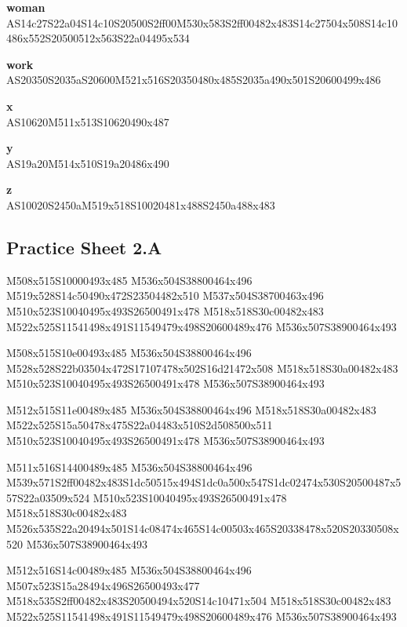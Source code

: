 \documentclass{article}
\begin{document}
\begin{glossary}
\textbf{woman}\\
AS14c27S22a04S14c10S20500S2ff00M530x583S2ff00482x483S14c27504x508S14c10486x552S20500512x563S22a04495x534

\textbf{work}\\
AS20350S2035aS20600M521x516S20350480x485S2035a490x501S20600499x486

\textbf{x}\\
AS10620M511x513S10620490x487

\textbf{y}\\
AS19a20M514x510S19a20486x490

\textbf{z}\\
AS10020S2450aM519x518S10020481x488S2450a488x483

\end{glossary}

\subsection{Practice Sheet 2.A}

\begin{multicols}{5}
\begin{center}

M508x515S10000493x485 %
M536x504S38800464x496 %
M519x528S14c50490x472S23504482x510 %
M537x504S38700463x496 %
M510x523S10040495x493S26500491x478 %
M518x518S30c00482x483 %
M522x525S11541498x491S11549479x498S20600489x476 %
M536x507S38900464x493 %
\vfil
\columnbreak

M508x515S10e00493x485 %
M536x504S38800464x496 %
M528x528S22b03504x472S17107478x502S16d21472x508 %
M518x518S30a00482x483 %
M510x523S10040495x493S26500491x478 %
M536x507S38900464x493 %
\vfil
\columnbreak

M512x515S11e00489x485 %
M536x504S38800464x496 %
M518x518S30a00482x483 %
M522x525S15a50478x475S22a04483x510S2d508500x511 %
M510x523S10040495x493S26500491x478 %
M536x507S38900464x493 %
\vfil
\columnbreak

M511x516S14400489x485 %
M536x504S38800464x496 %
M539x571S2ff00482x483S1dc50515x494S1dc0a500x547S1dc02474x530S20500487x557S22a03509x524 %
M510x523S10040495x493S26500491x478 %
M518x518S30c00482x483 %
M526x535S22a20494x501S14c08474x465S14c00503x465S20338478x520S20330508x520 %
M536x507S38900464x493 %
\vfil
\columnbreak

M512x516S14c00489x485 %
M536x504S38800464x496 %
M507x523S15a28494x496S26500493x477 %
M518x535S2ff00482x483S20500494x520S14c10471x504 %
M518x518S30c00482x483 %
M522x525S11541498x491S11549479x498S20600489x476 %
M536x507S38900464x493 %
\vfil

\end{center}
\end{multicols}
\end{document}
